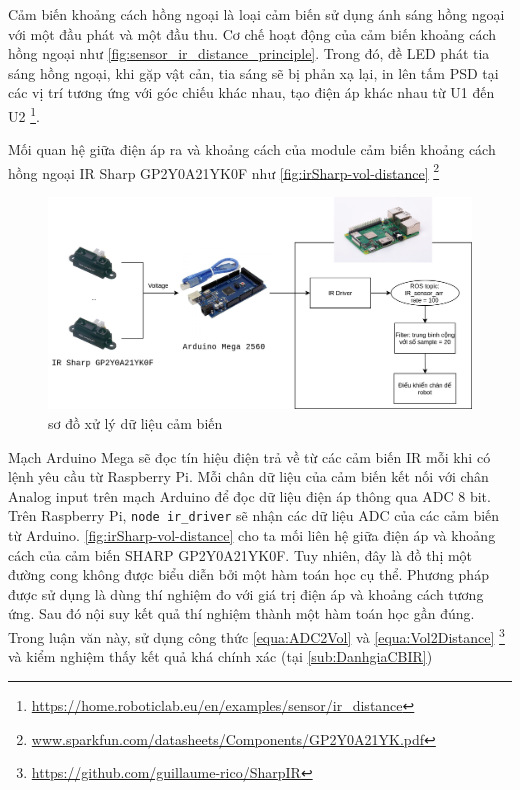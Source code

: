 Cảm biến khoảng cách hồng ngoại là loại cảm biến sử dụng ánh sáng hồng ngoại với một đầu phát và một đầu thu. Cơ chế hoạt động của cảm biến khoảng cách hồng ngoại như \figurename{ \ref{fig:sensor_ir_distance_principle}}. Trong đó, đề LED phát tia sáng hồng ngoại, khi gặp vật cản, tia sáng sẽ bị phản xạ lại, in lên tấm PSD tại các vị trí tương ứng với góc chiếu khác nhau, tạo điện áp khác nhau từ U1 đến U2 \footnote{\url{https://home.roboticlab.eu/en/examples/sensor/ir_distance}}.

Mối quan hệ giữa điện áp ra và khoảng cách của module cảm biến khoảng cách hồng ngoại IR Sharp GP2Y0A21YK0F như \figurename{ \ref{fig:irSharp-vol-distance}} \footnote{\url{www.sparkfun.com/datasheets/Components/GP2Y0A21YK.pdf}}

\begin{figure}[htbp]
    \centering
    \includegraphics[width=\linewidth]{figures/ir_safety_controller-dataProcessing.png}
    \caption{sơ đồ xử lý dữ liệu cảm biến}
    \label{fig:workflow-dataProcessing}
\end{figure}

Mạch Arduino Mega sẽ đọc tín hiệu điện trả về từ các cảm biến IR mỗi khi có lệnh yêu cầu từ Raspberry Pi. Mỗi chân dữ liệu của cảm biến kết nối với chân Analog input trên mạch Arduino để đọc dữ liệu điện áp thông qua ADC 8 bit.
Trên Raspberry Pi, {\tt node ir\_driver} sẽ nhận các dữ liệu ADC của các cảm biến từ Arduino. \figurename{ \ref{fig:irSharp-vol-distance}} cho ta mối liên hệ giữa điện áp và khoảng cách của cảm biến SHARP GP2Y0A21YK0F. Tuy nhiên, đây là đồ thị một đường cong không được biểu diễn bởi một hàm toán học cụ thể. Phương pháp được sử dụng là dùng thí nghiệm đo với giá trị điện áp và khoảng cách tương ứng. Sau đó nội suy kết quả thí nghiệm thành một hàm toán học gần đúng. Trong luận văn này, sử dụng công thức \ref{equa:ADC2Vol} và \ref{equa:Vol2Distance} \footnote{\url{https://github.com/guillaume-rico/SharpIR}} và kiểm nghiệm thấy kết quả khá chính xác (tại \ref{sub:DanhgiaCBIR})

